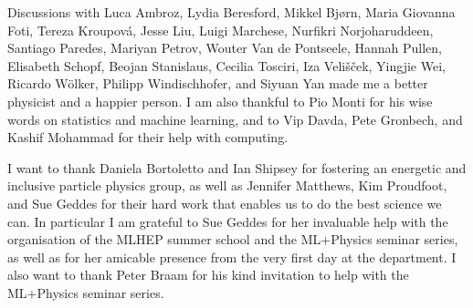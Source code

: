 \begin{acknowledgements}
Discussions with Luca Ambroz, Lydia Beresford, Mikkel Bj{\o}rn, Maria Giovanna Foti,
Tereza Kroupov\'a, Jesse Liu, Luigi Marchese,
Nurfikri Norjoharuddeen, Santiago Paredes, Mariyan Petrov, Wouter Van de Pontseele,
Hannah Pullen, Elisabeth Schopf, Beojan Stanislaus, Cecilia Tosciri,
Iza Veli\v{s}\v{c}ek, Yingjie Wei, Ricardo W\"olker, Philipp Windischhofer,
and Siyuan Yan made me a better physicist
and a happier person. I am also thankful to Pio Monti for his wise
words on statistics and machine learning, and to Vip Davda, Pete Gronbech, and
Kashif Mohammad for their help with computing.

I want to thank Daniela Bortoletto and Ian Shipsey for fostering an energetic
and inclusive particle physics group, as well as Jennifer Matthews, Kim Proudfoot,
and Sue Geddes for their hard work that enables us to do the best science we can.
In particular I am grateful to Sue Geddes for her invaluable help with the
organisation of the MLHEP summer school and the ML+Physics seminar series,
as well as for her amicable presence from the very first day at the department. I
also want to thank Peter Braam for his kind invitation to help with the
ML+Physics seminar series.
\end{acknowledgements}

